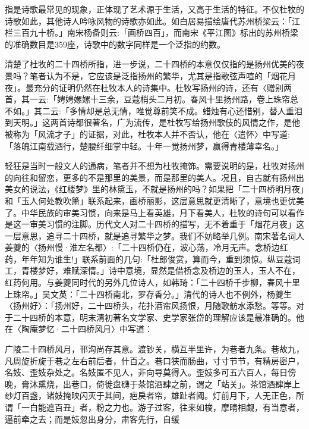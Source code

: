 \noindent 指是诗歌最常见的现象，正体现了艺术源于生活，又高于生活的特征。不仅杜牧的诗歌如此，其他诗人吟咏风物的诗歌亦如此。如白居易描绘唐代苏州桥梁云：「江栏三百九十桥。」南宋杨备则云:「画桥四百」，而南宋《平江图》标出的苏州桥梁的准确数目是359座，诗歌中的数字同样是一个泛指的约数。

清楚了杜牧的二十四桥所指，进一步说，二十四桥的本意仅仅指的是扬州优美的夜景吗？笔者认为不是，它应该是泛指扬州的繁华，尤其是指歌弦声喧的「烟花月夜」。最充分的证明仍然在杜牧本人的诗集中。杜牧写扬州的诗，还有〈赠别两首，其一云:「娉娉嫘嫘十三余，豆蔻梢头二月初。春风十里扬州路，卷上珠帘总不如。」其二云:「多情却是总无情，唯觉尊前笑不成。蜡烛有心还惜别，替人垂泪到天明。」这两首诗都很著名，广为流传，是杜牧写给扬州歌伎的风情之作，是他被称为「风流才子」的证据，对此，杜牧本人并不否认，他在〈遣怀〉中写道:「落魄江南载酒行，楚腰纤细掌中轻。十年一觉扬州梦，赢得青楼薄幸名。」

轻狂是当时一般文人的通病，笔者并不想为杜牧掩饰。需要说明的是，杜牧对扬州的向往和留恋，更多的不是那里的美景，而是那里的美人。况且，自古就有扬州出美女的说法，《红楼梦》里的林黛玉，不就是扬州的吗？如果把「二十四桥明月夜」和「玉人何处教吹箫」联系起来，画桥丽影，这层意思就更清晰了，意境也更优美了。中华民族的审美习惯，向来是马上看英雄，月下看美人，杜牧的诗句可以看作是这一审美习惯的注脚。历代文人对二十四桥的描写，无不着重于「烟花月夜」这一层意思，追寻二十四桥，就是追寻繁华之梦。我们不妨略举几例。南宋著名词人姜夔的〈扬州慢·淮左名都〉:「二十四桥仍在，波心荡，冷月无声。念桥边红药，年年知为谁生!」联系前面的几句:「杜郎俊赏，算而今，重到须惊。纵豆蔻词工，青楼梦好，难赋深情。」诗中意境，显然是借桥念及桥边的玉人，玉人不在，红药何用。与姜夔同时代的另外几位诗人，如韩琦：「二十四桥千步柳，春风十里上珠帘。」吴文英：「二十四桥南北，罗存香分。」清代的诗人也不例外，杨夔生〈扬州好〉：「扬州好，二十四桥头，花扑酒帘风扬恨，月随歌舫水添愁。等等。对于二十四桥的本意，明末清初著名文学家、史学家张岱的理解应该是最准确的。他在〈陶庵梦忆·二十四桥风月〉中写道：


\begin{BookQuote}
广陵二十四桥风月，邗沟尚存其意。渡钞关，横互半里许，为巷者九条。巷故九，凡周旋折旋于巷之左右前后者，什百之。巷口狭而肠曲，寸寸节节，有精房密户，名妓、歪妓杂处之。名妓匿不见人，非向导莫得入。歪妓多可五六百人，每日傍晚，膏沐熏烧，出巷口，倚徙盘礴于茶馆酒肆之前，谓之「站关」。茶馆酒肆岸上纱灯百盏，诸妓掩映闪灭于其间，疤戾者帘，雄趾者阈。灯前月下，人无正色，所谓「一白能遮百丑」者，粉之力也。游子过客，往来如梭，摩睛相觑，有当意者，逼前牵之去；而是妓忽出身分，肃客先行，自缓
\end{BookQuote}

